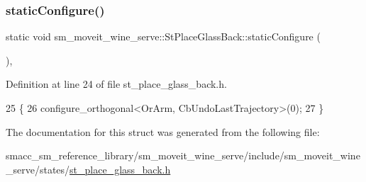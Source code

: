 \subsubsection{\texorpdfstring{static\+Configure()}{staticConfigure()}}
{\footnotesize\ttfamily static void sm\+\_\+moveit\+\_\+wine\+\_\+serve\+::\+St\+Place\+Glass\+Back\+::static\+Configure (\begin{DoxyParamCaption}{ }\end{DoxyParamCaption})\hspace{0.3cm}{\ttfamily [inline]}, {\ttfamily [static]}}



Definition at line 24 of file st\+\_\+place\+\_\+glass\+\_\+back.\+h.


\begin{DoxyCode}
25         \{
26             configure\_orthogonal<OrArm, CbUndoLastTrajectory>(0);
27         \}
\end{DoxyCode}


The documentation for this struct was generated from the following file\+:\begin{DoxyCompactItemize}
\item 
smacc\+\_\+sm\+\_\+reference\+\_\+library/sm\+\_\+moveit\+\_\+wine\+\_\+serve/include/sm\+\_\+moveit\+\_\+wine\+\_\+serve/states/\hyperlink{st__place__glass__back_8h}{st\+\_\+place\+\_\+glass\+\_\+back.\+h}\end{DoxyCompactItemize}
